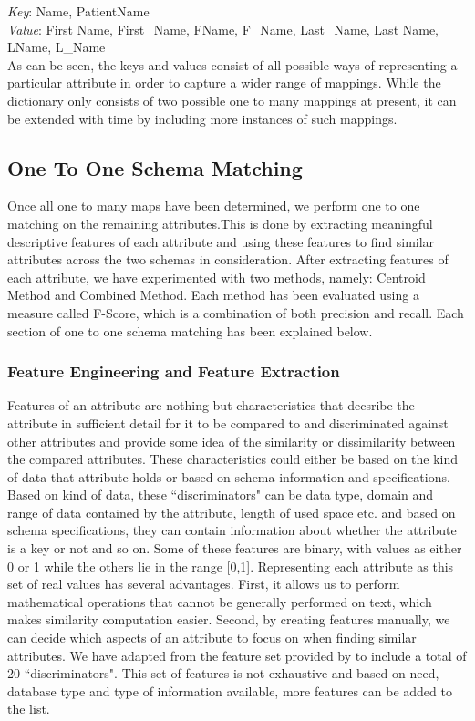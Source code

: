 \documentclass[conference]{IEEEtran}
\begin{document}
\noindent
\textit{Key}: Name, PatientName\\
\textit{Value}: First Name, First\_Name, FName, F\_Name, Last\_Name, Last Name, LName, L\_Name\\

As can be seen, the keys and values consist of all possible ways of representing a particular attribute in order to capture a wider range of mappings. While the dictionary only consists of two possible one to many mappings at present, it can be extended with time by including more instances of such mappings. 

\subsection{One To One Schema Matching}
Once all one to many maps have been determined, we perform one to one matching on the remaining attributes.This is done by extracting meaningful descriptive features of each attribute and using these features to find similar attributes across the two schemas in consideration. After extracting features of each attribute, we have experimented with two methods, namely: Centroid Method and Combined Method. Each method has been evaluated using a measure called F-Score, which is a combination of both precision and recall. Each section of one to one schema matching has been explained below.

\subsubsection*{\textbf{Feature Engineering and Feature Extraction}}

Features of an attribute are nothing but characteristics that decsribe the attribute in sufficient detail for it to be compared to and discriminated against other attributes and provide some idea of the similarity or dissimilarity between the compared attributes. These characteristics could either be based on the kind of data that attribute holds or based on schema information and specifications. Based on kind of data, these ``discriminators" can be data type, domain and range of data contained by the attribute, length of used space etc. and based on schema specifications, they can contain information about whether the attribute is a key or not and so on. Some of these features are binary, with values as either 0 or 1 while the others lie in the range [0,1]. Representing each attribute as this set of real values has several advantages. First, it allows us to perform mathematical operations that cannot be generally performed on text, which makes similarity computation easier. Second, by creating features manually, we can decide which aspects of an attribute to focus on when finding similar attributes. We have adapted from the feature set provided by \cite{ref1} to include a total of 20 ``discriminators". This set of features is not exhaustive and based on need, database type and type of information available, more features can be added to the list.
\end{document}
